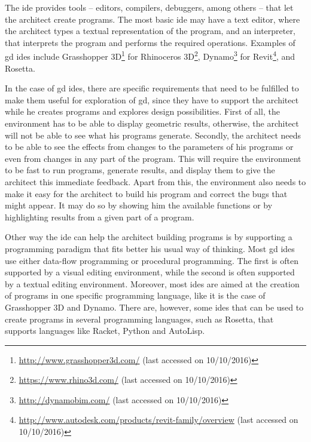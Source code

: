 The \gls{ide} provides tools -- editors, compilers, debuggers, among others -- that let the architect create programs.
The most basic \gls{ide} may have a text editor, where the architect types a textual representation of the program, and an interpreter, that interprets the program and performs the required operations.
Examples of \gls{gd} \glspl{ide} include Grasshopper 3D\footnote{\url{http://www.grasshopper3d.com/} (last accessed on 10/10/2016)} for Rhinoceros 3D\footnote{\url{https://www.rhino3d.com/} (last accessed on 10/10/2016)}, Dynamo\footnote{\url{http://dynamobim.com/} (last accessed on 10/10/2016)} for Revit\footnote{\url{http://www.autodesk.com/products/revit-family/overview} (last accessed on 10/10/2016)}, and Rosetta\cite{de2012modern}.

In the case of \gls{gd} \glspl{ide}, there are specific requirements that need to be fulfilled to make them useful for exploration of \gls{gd}, since they have to support the architect while he creates programs and explores design possibilities.
First of all, the environment has to be able to display geometric results, otherwise, the architect will not be able to see what his programs generate.
Secondly, the architect needs to be able to see the effects from changes to the parameters of his programs or even from changes in any part of the program.
This will require the environment to be fast to run programs, generate results, and display them to give the architect this immediate feedback.
Apart from this, the environment also needs to make it easy for the architect to build his program and correct the bugs that might appear.
It may do so by showing him the available functions or by highlighting results from a given part of a program.

Other way the \gls{ide} can help the architect building programs is by supporting a programming paradigm that fits better his usual way of thinking.
Most \gls{gd} \glspl{ide} use either data-flow programming or procedural programming.
The first is often supported by a visual editing environment, while the second is often supported by a textual editing environment.
Moreover, most \glspl{ide} are aimed at the creation of programs in one specific programming language, like it is the case of Grasshopper 3D and Dynamo.
There are, however, some \glspl{ide} that can be used to create programs in several programming languages, such as Rosetta, that supports languages like Racket, Python and AutoLisp.

